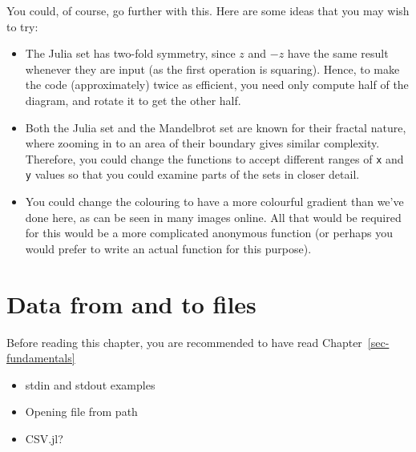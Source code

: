 \documentclass[
  letterpaper,
  DIV=11,
  numbers=noendperiod]{scrreprt}
\begin{document}
You could, of course, go further with this. Here are some ideas that you
may wish to try:

\begin{itemize}
\item
  The Julia set has two-fold symmetry, since \(z\) and \(-z\) have the
  same result whenever they are input (as the first operation is
  squaring). Hence, to make the code (approximately) twice as efficient,
  you need only compute half of the diagram, and rotate it to get the
  other half.
\item
  Both the Julia set and the Mandelbrot set are known for their fractal
  nature, where zooming in to an area of their boundary gives similar
  complexity. Therefore, you could change the functions to accept
  different ranges of \texttt{x} and \texttt{y} values so that you could
  examine parts of the sets in closer detail.
\item
  You could change the colouring to have a more colourful gradient than
  we've done here, as can be seen in many images online. All that would
  be required for this would be a more complicated anonymous function
  (or perhaps you would prefer to write an actual function for this
  purpose).
\end{itemize}

\hypertarget{sec-readwrite}{%
\chapter{Data from and to files}\label{sec-readwrite}}

\begin{tcolorbox}[enhanced jigsaw, toprule=.15mm, opacitybacktitle=0.6, leftrule=.75mm, breakable, coltitle=black, bottomrule=.15mm, colbacktitle=quarto-callout-important-color!10!white, bottomtitle=1mm, rightrule=.15mm, title=\textcolor{quarto-callout-important-color}{\faExclamation}\hspace{0.5em}{Prerequisites}, colframe=quarto-callout-important-color-frame, left=2mm, colback=white, opacityback=0, arc=.35mm, toptitle=1mm, titlerule=0mm]

Before reading this chapter, you are recommended to have read
Chapter~\ref{sec-fundamentals}

\end{tcolorbox}

\begin{itemize}
\item
  stdin and stdout examples
\item
  Opening file from path
\item
  CSV.jl?
\end{itemize}
\end{document}
